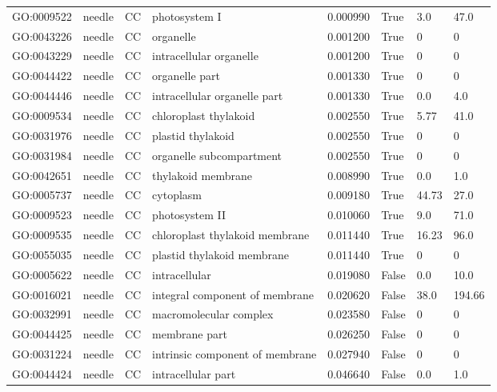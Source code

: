 \begin{longtable}{llllrl}
GO:0009522 & needle & CC &   photosystem I  & 0.000990 &   True  & 3.0 & 47.0 \\ 
GO:0043226 & needle & CC &   organelle  & 0.001200 &   True  & 0 & 0 \\
GO:0043229 & needle & CC &   intracellular organelle  & 0.001200 &   True  & 0 & 0 \\
GO:0044422 & needle & CC &   organelle part  & 0.001330 &   True  & 0 & 0 \\
GO:0044446 & needle & CC &   intracellular organelle part  & 0.001330 &   True  & 0.0 & 4.0 \\ 
GO:0009534 & needle & CC &   chloroplast thylakoid  & 0.002550 &   True  & 5.77 & 41.0 \\ 
GO:0031976 & needle & CC &   plastid thylakoid  & 0.002550 &   True  & 0 & 0 \\
GO:0031984 & needle & CC &   organelle subcompartment  & 0.002550 &   True  & 0 & 0 \\
GO:0042651 & needle & CC &   thylakoid membrane  & 0.008990 &   True  & 0.0 & 1.0 \\ 
GO:0005737 & needle & CC &   cytoplasm  & 0.009180 &   True  & 44.73 & 27.0 \\ 
GO:0009523 & needle & CC &   photosystem II  & 0.010060 &   True  & 9.0 & 71.0 \\ 
GO:0009535 & needle & CC &   chloroplast thylakoid membrane  & 0.011440 &   True  & 16.23 & 96.0 \\ 
GO:0055035 & needle & CC &   plastid thylakoid membrane  & 0.011440 &   True  & 0 & 0 \\
GO:0005622 & needle & CC &   intracellular  & 0.019080 &   False  & 0.0 & 10.0 \\ 
GO:0016021 & needle & CC &   integral component of membrane  & 0.020620 &   False  & 38.0 & 194.66 \\ 
GO:0032991 & needle & CC &   macromolecular complex  & 0.023580 &   False  & 0 & 0 \\
GO:0044425 & needle & CC &   membrane part  & 0.026250 &   False  & 0 & 0 \\
GO:0031224 & needle & CC &   intrinsic component of membrane  & 0.027940 &   False  & 0 & 0 \\
GO:0044424 & needle & CC &   intracellular part  & 0.046640 &   False  & 0.0 & 1.0 \\ 
\bottomrule
\end{longtable}
